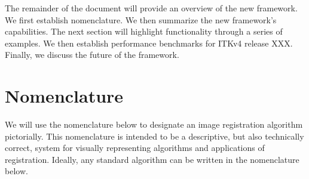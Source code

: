 \documentclass{llncs}
\begin{document}

The remainder of the document will provide an overview of the new
framework.  We first establish nomenclature.  We then summarize the
new framework's capabilities.  The next section will highlight
functionality through a series of examples.  We then establish
performance benchmarks for ITKv4 release XXX.  Finally, we discuss the
future of the framework.

\section{Nomenclature}
We will use the nomenclature below to designate an image registration
algorithm pictorially.  This nomenclature is intended to be a
descriptive, but also technically correct, system for visually
representing algorithms and applications of registration.  Ideally,
any standard algorithm can be written in the nomenclature below.
\end{document}
